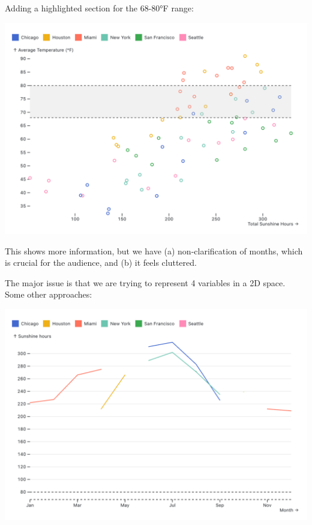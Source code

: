 \documentclass{article}
\begin{document}
\pagebreak

Adding a highlighted section for the 68-80°F range:

\begin{center}
    \includegraphics[scale=0.2]{scatter2.png}
\end{center}

This shows more information, but we have (a) non-clarification of months, which is crucial for the audience, and (b) it feels cluttered.

The major issue is that we are trying to represent 4 variables in a 2D space. 
Some other approaches:

\begin{center}
    \includegraphics[scale=0.2]{line3.png}
\end{center}
\end{document}

